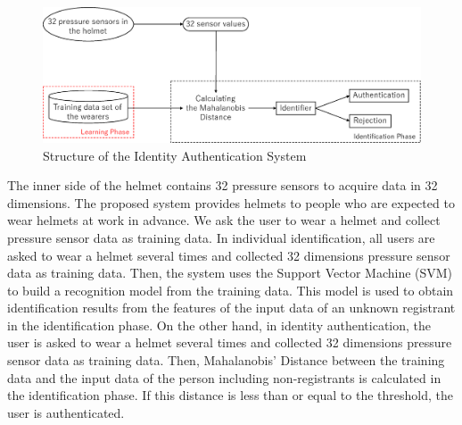 \documentclass[sigchi,authordraft]{acmart}
\begin{document}
\begin{figure}[!t]
  \centering
    \includegraphics[width=1\linewidth]{figure/system_mahalanobis.eps}
  \caption{Structure of the Identity Authentication System}
  \label{fig:system_mahalanobis}
\end{figure}

The inner side of the helmet contains 32 pressure sensors to acquire data in 32 dimensions. The proposed system provides helmets to people who are expected to wear helmets at work in advance. We ask the user to wear a helmet and collect pressure sensor data as training data. In individual identification, all users are asked to wear a helmet several times and collected 32 dimensions pressure sensor data as training data. Then, the system uses the Support Vector Machine (SVM) to build a recognition model from the training data. This model is used to obtain identification results from the features of the input data of an unknown registrant in the identification phase. On the other hand, in identity authentication, the user is asked to wear a helmet several times and collected 32 dimensions pressure sensor data as training data. Then, Mahalanobis' Distance between the training data and the input data of the person including non-registrants is calculated in the identification phase. If this distance is less than or equal to the threshold, the user is authenticated.

\end{document}
